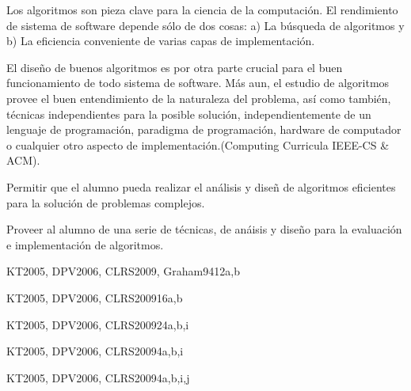 \begin{syllabus}


\begin{justification}
Los algoritmos son pieza clave para la ciencia de la computación. 
El rendimiento de sistema de software
depende sólo de dos cosas: a) La búsqueda de  algoritmos y b) La
eficiencia conveniente de varias capas de implementación.

El diseño de buenos algoritmos es por otra parte crucial para el
buen funcionamiento de todo sistema de software. Más aun, el
estudio  de algoritmos provee el buen entendimiento de la
naturaleza  del problema, así como también, técnicas
independientes para la posible solución, independientemente de un
lenguaje de programación, paradigma de programación, hardware de
computador o cualquier otro aspecto de implementación.(Computing
Curricula IEEE-CS \& ACM).
\end{justification}

\begin{goals}
 \item Permitir que el alumno pueda realizar el análisis y diseñ
de algoritmos eficientes para la solución de problemas complejos.

 \item Proveer al alumno de una serie de técnicas, de anáisis y
diseño para la evaluación e implementación de algoritmos.
\end{goals}


\begin{unit}{\ALBasicAnalysisDef}{}{KT2005, DPV2006, CLRS2009, Graham94}{12}{a,b}
    \ALBasicAnalysisAllTopics
    \ALBasicAnalysisAllObjectives
\end{unit}

\begin{unit}{\ALFundamentalAlgorithmsDef}{}{KT2005, DPV2006, CLRS2009}{16}{a,b}
    \ALFundamentalAlgorithmsAllTopics
    \ALFundamentalAlgorithmsAllObjectives
\end{unit}

\begin{unit}{\ALAlgoritmicStrategiesDef}{}{KT2005, DPV2006, CLRS2009}{24}{a,b,i}
   \ALAlgoritmicStrategiesAllTopics
   \ALAlgoritmicStrategiesAllObjectives
\end{unit}

\begin{unit}{\ALDistributedAlgorithmsDef}{}{KT2005, DPV2006, CLRS2009}{4}{a,b,i}
   \ALDistributedAlgorithmsAllTopics
   \ALDistributedAlgorithmsAllObjectives
\end{unit}

\begin{unit}{\ALPversusNPDef}{}{KT2005, DPV2006, CLRS2009}{4}{a,b,i,j}
   \ALPversusNPAllTopics
   \ALPversusNPAllObjectives
\end{unit}

\begin{coursebibliography}
\end{coursebibliography}

\end{syllabus}
